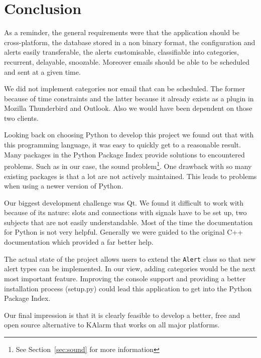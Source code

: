 \chapter{Conclusion}

As a reminder, the general requirements were that the application should be
cross-platform, the database stored in a non binary format, the configuration
and alerts easily transferable, the alerts customisable, classifiable into
categories, recurrent, delayable, snoozable. Moreover emails should be able to
be scheduled and sent at a given time.

We did not implement categories nor email that can be scheduled. The former
because of time constraints and the latter because it already exists as a plugin
in Mozilla Thunderbird and Outlook. Also we would have been dependent on those
two clients.

Looking back on choosing Python to develop this project we found out that with
this programming language, it was easy to quickly get to a reasonable result.
Many packages in the Python Package Index provide solutions to encountered
problems. Such as in our case, the sound problem\footnote{See
Section~\ref{sec:sound} for more information}. One drawback with so many
existing packages is that a lot are not actively maintained. This leads to
problems when using a newer version of Python.

Our biggest development challenge was Qt. We found it difficult to work with
because of its nature: slots and connections with signals have to be set up, two
subjects that are not easily understandable. Most of the time the documentation
for Python is not very helpful. Generally we were guided to the original C++
documentation which provided a far better help.

The actual state of the project allows users to extend the \texttt{Alert} class
so that new alert types can be implemented. In our view, adding categories would
be the next most important feature. Improving the console support and
providing a better installation process (setup.py) could lead this application
to get into the Python Package Index.

Our final impression is that it is clearly feasible to develop a better, free
and open source alternative to KAlarm that works on all major platforms.
